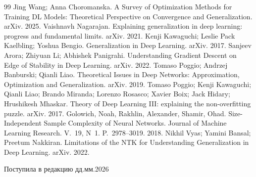 \begin{thebibliography}{99}
 Jing Wang; Anna Choromanska. A Survey of Optimization Methods for Training DL Models: Theoretical Perspective on Convergence and Generalization. arXiv. 2025.
 Vaishnavh Nagarajan. Explaining generalization in deep learning: progress and fundamental limits. arXiv. 2021.
 Kenji Kawaguchi; Leslie Pack Kaelbling; Yoshua Bengio. Generalization in Deep Learning. arXiv. 2017.
 Sanjeev Arora; Zhiyuan Li; Abhishek Panigrahi. Understanding Gradient Descent on Edge of Stability in Deep Learning. arXiv. 2022.
 Tomaso Poggio; Andrzej Banburski; Qianli Liao. Theoretical Issues in Deep Networks: Approximation, Optimization and Generalization. arXiv. 2019.
 Tomaso Poggio; Kenji Kawaguchi; Qianli Liao; Brando Miranda; Lorenzo Rosasco; Xavier Boix; Jack Hidary; Hrushikesh Mhaskar. Theory of Deep Learning III: explaining the non-overfitting puzzle. arXiv. 2017.
 Golowich, Noah, Rakhlin, Alexander, Shamir, Ohad. Size-Independent Sample Complexity of Neural Networks. Journal of Machine Learning Research. V.~19, N~1. P.~2978--3019. 2018.
 Nikhil Vyas; Yamini Bansal; Preetum Nakkiran. Limitations of the NTK for Understanding Generalization in Deep Learning. arXiv. 2022.
\end{thebibliography}

\begin{flushright}
Поступила в редакцию дд.мм.2026
\end{flushright}